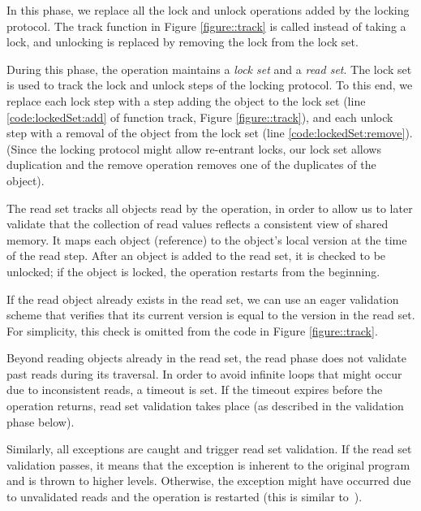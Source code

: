 In this phase, we replace all the lock and unlock operations added by the locking protocol.
The track function in Figure \ref{figure::track} is called instead of taking a lock, and unlocking 
is replaced by removing the lock from the lock set.

During this phase, the operation maintains a \emph{lock set} and a \emph{read set}. 
The lock set is used to track the lock and unlock steps of the locking protocol. To this end, we replace each lock step 
  with a step adding the object to the lock set 
  (line \ref{code:lockedSet:add} of function track, Figure \ref{figure::track}), 
  and each unlock step with a removal of the object 
  from the lock set (line \ref{code:lockedSet:remove}). 
  (Since the locking protocol might allow re-entrant locks, 
  our lock set allows duplication and the remove 
  operation removes one of the duplicates of the object).
  
The read set  tracks all objects read by the 
operation, in order to allow us to later validate that the collection of read
values reflects a consistent view of shared memory.  It maps each object (reference)  
to the object's local version at the time of the read step. After an object is
added to the read set, it is checked to be unlocked; if the object is locked, the operation restarts from the beginning.



 
If the read object already exists in the read set, we can use an eager
validation scheme that verifies that its current version is equal to the
version in the read set. 
For simplicity, this check is omitted from the code in Figure \ref{figure::track}.
 
Beyond reading objects already in the read set,
the read phase does not validate past reads during its traversal.  
In order to avoid infinite loops that might occur due to inconsistent reads, a timeout is set. 
If the timeout expires before the operation returns, read set 
validation takes place (as described in the validation phase below).

Similarly, all exceptions are caught and trigger read set validation. 
If the read set validation passes, it means that the exception is inherent
to the original program and is thrown to higher levels. Otherwise, the
exception might have occurred due to unvalidated reads and the operation is
restarted (this is similar to~\cite{Nakaike:2010}). 

